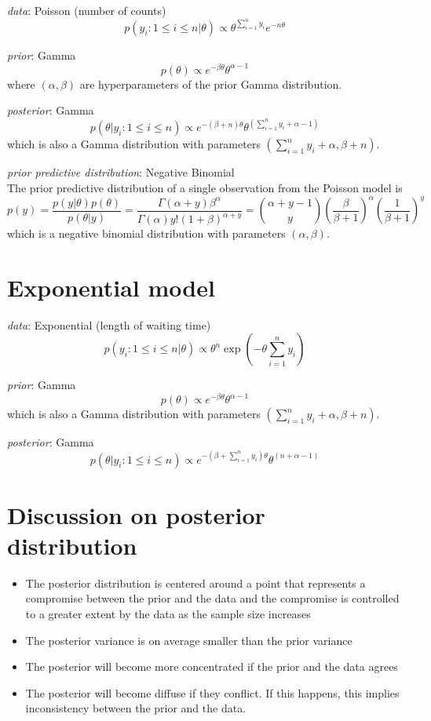 \documentclass[twoside]{article}
\begin{document}
\textit{data}: Poisson (number of counts)\\ 
$$
p(y_i:1\leq i\leq n|\theta)\propto \theta^{\sum_{i=1}^{n}y_i}e^{-n\theta}
$$
 
\textit{prior}: Gamma  \\
$$
p(\theta)\propto e^{-\beta\theta}\theta^{\alpha-1}
$$
where $(\alpha,\beta)$ are hyperparameters of the prior Gamma distribution.

\textit{posterior}: Gamma \\ 
$$
p(\theta|y_i:1\leq i\leq n)\propto e^{-(\beta+n)\theta}\theta^{(\sum_{i=1}^{n}y_i+\alpha-1)}
$$
which is also a Gamma distribution with parameters $(\sum_{i=1}^{n}y_i+\alpha,\beta+n)$.

\textit{prior predictive distribution}: Negative Binomial  \\
The prior predictive distribution of a single observation from the Poisson model is
$$
p(y)=\frac{p(y|\theta)p(\theta)}{p(\theta|y)}=\frac{\Gamma(\alpha+y)\beta^{\alpha}}{\Gamma(\alpha)y!(1+\beta)^{\alpha+y}}=\binom{\alpha+y-1}{y}(\frac{\beta}{\beta+1})^{\alpha}(\frac{1}{\beta+1})^{y}
$$
which is a negative binomial distribution with parameters $(\alpha,\beta)$.

\section{Exponential model}

\textit{data}: Exponential (length of waiting time)\\ 
$$
p(y_i:1\leq i\leq n|\theta)\propto \theta^{n}\exp{(-\theta\sum_{i=1}^{n}y_i)}
$$

\textit{prior}: Gamma  \\
$$
p(\theta)\propto e^{-\beta\theta}\theta^{\alpha-1}
$$
which is also a Gamma distribution with parameters $(\sum_{i=1}^{n}y_i+\alpha,\beta+n)$.

\textit{posterior}: Gamma 
$$
p(\theta|y_i:1\leq i\leq n)\propto e^{-(\beta+\sum_{i=1}^{n}y_i)\theta}\theta^{(n+\alpha-1)}
$$

\section{Discussion on posterior distribution}
\begin{itemize}
    \item The posterior distribution is centered around a point that represents
        a compromise between the prior and the data and the compromise is controlled to a greater extent by the data as the sample size increases
    \item The posterior variance is on average smaller than the prior variance
    \item The posterior will become more concentrated if the prior and the data agrees
    \item The posterior will become diffuse if they conflict. If this happens,
        this implies inconsistency between the prior and the data.
\end{itemize}
\end{document}
